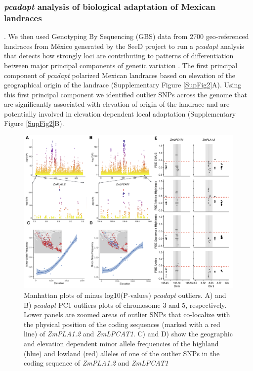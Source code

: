 \documentclass[9pt,twocolumn,twoside,lineno]{BioRxiv}
\begin{document}
\subsubsection{\textit{pcadapt} analysis of biological adaptation of Mexican landraces}.  
We then used Genotyping By Sequencing (GBS) data from 2700 geo-referenced landraces from México generated by the SeeD project \cite{Romero_Navarro2017-cn, Gates2019-xu} to run a \textit{pcadapt} analysis that detects how strongly loci are contributing to patterns of differentiation between major principal components of genetic variation \cite{Luu2017-ws}.
The first principal component of \textit{pcadapt} polarized Mexican landraces based on elevation of the geographical origin of the landrace (Supplementary Figure \ref{SupFig2}A).
Using this first principal component we identified outlier SNPs across the genome that are significantly associated with elevation of origin of the landrace and are potentially involved in elevation dependent local adaptation (Supplementary Figure \ref{SupFig2}B). 
\begin{figure}[h]
\begin{center}
\includegraphics[width=0.4\paperwidth]{Figures/Fig_2.png}
\caption{Manhattan plots of minus log10(P‐values) \textit{pcadapt} outliers. A) and B) \textit{pcadapt} PC1 outliers plots of chromosome 3 and 5, respectively. 
Lower panels are zoomed areas of outlier SNPs that co-localize with the physical position of the coding sequences (marked with a red line) of \textit{ZmPLA1.2} and \textit{ZmLPCAT1}. C) and D) show the geographic and elevation dependent minor allele frequencies of the highland (blue) and lowland (red) alleles of one of the outlier SNPs in the coding sequence of \textit{ZmPLA1.2} and \textit{ZmLPCAT1}}
\label{Fig2}
\end{center}
\end{figure} 
\end{document}
